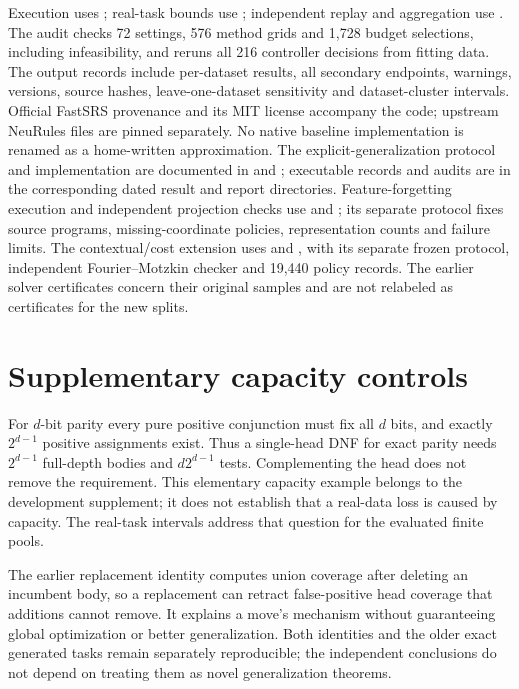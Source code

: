 \documentclass[review,12pt]{elsarticle}
\begin{document}
Execution uses ; real-task bounds use ; independent replay and aggregation use . The audit checks 72 settings, 576 method grids and 1,728 budget selections, including infeasibility, and reruns all 216 controller decisions from fitting data. The output records include per-dataset results, all secondary endpoints, warnings, versions, source hashes, leave-one-dataset sensitivity and dataset-cluster intervals. Official FastSRS provenance and its MIT license accompany the code; upstream NeuRules files are pinned separately. No native baseline implementation is renamed as a home-written approximation. The explicit-generalization protocol and implementation are documented in  and ; executable records and audits are in the corresponding dated result and report directories. Feature-forgetting execution and independent projection checks use  and ; its separate protocol fixes source programs, missing-coordinate policies, representation counts and failure limits. The contextual/cost extension uses  and , with its separate frozen protocol, independent Fourier--Motzkin checker and 19,440 policy records. The earlier solver certificates concern their original samples and are not relabeled as certificates for the new splits.

\section{Supplementary capacity controls}\label{app:synthetic}
For $d$-bit parity every pure positive conjunction must fix all $d$ bits, and exactly $2^{d-1}$ positive assignments exist. Thus a single-head DNF for exact parity needs $2^{d-1}$ full-depth bodies and $d2^{d-1}$ tests. Complementing the head does not remove the requirement. This elementary capacity example belongs to the development supplement; it does not establish that a real-data loss is caused by capacity. The real-task intervals address that question for the evaluated finite pools.

The earlier replacement identity computes union coverage after deleting an incumbent body, so a replacement can retract false-positive head coverage that additions cannot remove. It explains a move's mechanism without guaranteeing global optimization or better generalization. Both identities and the older exact generated tasks remain separately reproducible; the independent conclusions do not depend on treating them as novel generalization theorems.
\end{document}
